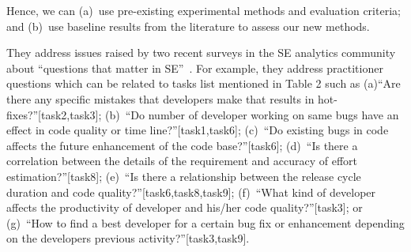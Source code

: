 Hence, we can (a)~use pre-existing experimental methods and evaluation criteria; and (b)~use  baseline results  from the literature to 
assess   our new methods. 
\item
They address
issues raised by two recent surveys in the SE analytics community
about  ``questions that matter in SE''~\cite{Begel:2014,gupta2015identifying}.
For example, they address practitioner questions which can be related to tasks list mentioned in Table 2 such as (a)``Are there any specific mistakes that developers make that results in hot-fixes?''[task2,task3]; (b)~``Do number of developer working on same bugs have an effect in code quality or time line?''[task1,task6];
(c)~``Do existing bugs in code affects the future enhancement of the code base?''[task6];
(d)~``Is there a  correlation between the details of the requirement and accuracy of effort estimation?''[task8];
(e)~``Is there a relationship between the release cycle duration and code quality?''[task6,task8,task9]; (f)~``What kind of developer affects the productivity of developer and his/her code quality?''[task3];
or (g)~``How to find a best developer for a certain bug fix or enhancement depending on the developers previous activity?''[task3,task9].
\ei
